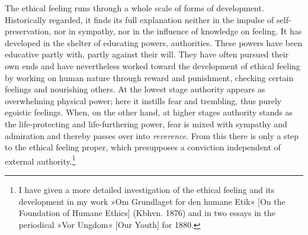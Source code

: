 \documentclass[12pt,a4paper]{book}
\newcommand{\opage}[1]{\marginnote{\footnotesize\textit{[#1]}}}
\begin{document}
The ethical feeling runs through a whole scale of forms of development.
Historically regarded, it finds its full explanation neither in the
impulse of self-preservation, nor in sympathy, nor in the influence of
knowledge on feeling. It has developed in the shelter
\opage{312}of educating powers, authorities. These powers have been
educative partly with, partly against their will. They have often
pursued their own ends and have nevertheless worked toward the
development of ethical feeling by working on human nature through reward
and punishment, checking certain feelings and nourishing others. At the
lowest stage authority appears as overwhelming physical power; here it
instills fear and trembling, thus purely egoistic feelings. When, on the
other hand, at higher stages authority stands as the life-protecting and
life-furthering power, fear is mixed with sympathy and admiration and
thereby passes over into \emph{reverence}. From this there is only a step
to the ethical feeling proper, which presupposes a conviction
independent of external authority.\footnote{I have given a more
detailed investigation of the ethical feeling and its development in my
work »Om Grundlaget for den humane Etik« [On the Foundation of Humane
Ethics] (Kbhvn. 1876) and in two essays in the periodical »Vor Ungdom«
[Our Youth] for 1880.}
\end{document}
